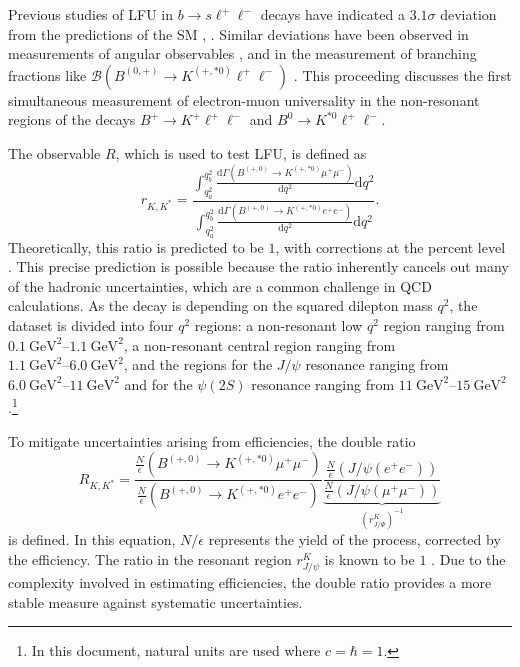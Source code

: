 Previous studies of LFU in $b\to s\ell^+\ell^-$ decays have indicated a $\num{3.1}\sigma$ 
deviation from the predictions of the SM \cite{previous_RK}, \cite{previous_RK*}. 
Similar deviations have been observed in measurements of angular observables \cite{angular_1}, 
\cite{angular_2} and in the measurement of branching fractions like 
$\mathcal{B}(B^{(0,+)}\to K^{(+,*0)}\ell^+\ell^-)$ \cite{Branchingfraction}. 
This proceeding discusses the first simultaneous measurement of electron-muon 
universality in the non-resonant regions of the decays $B^+\to K^+\ell^+\ell^-$ and $B^0\to K^{*0}\ell^+\ell^-$.

The observable $R$, which is used to test LFU, is defined as
\begin{equation}
    r_{K,K^*}= 
    \frac{\int_{q_a^2}^{q_b^2}\frac{\mathrm{d}\Gamma(B^{(+,0)}\to K^{(+,*0)}\mu^+\mu^-)}{\mathrm{d}q^2}\mathrm{d}q^2}
    {\int_{q_a^2}^{q_b^2}\frac{\mathrm{d}\Gamma(B^{(+,0)}\to K^{(+,*0)}e^+e^-)}{\mathrm{d}q^2}\mathrm{d}q^2} .
    \label{eqn:single_ratio}
\end{equation}
Theoretically, this ratio is predicted to be $\num{1}$, with corrections at 
the percent level \cite{LU_theo}. This precise prediction is possible because the ratio inherently 
cancels out many of the hadronic uncertainties, which are a common challenge in QCD calculations.
As the decay is depending on the squared dilepton mass $q^2$, the dataset is divided into four $q^2$ regions:
a non-resonant low $q^2$ region ranging from
$\SIrange{0.1}{1.1}{\giga\electronvolt\squared}$,
a non-resonant central region ranging from
$\SIrange{1.1}{6.0}{\giga\electronvolt\squared}$,
and the regions for the $J\!/\!\psi$ resonance ranging from 
$\SIrange{6.0}{11}{\giga\electronvolt\squared}$
and for the $\psi(2S)$ resonance ranging from
$\SIrange{11}{15}{\giga\electronvolt\squared}$.\footnote{In this document, natural units are used where $c=\hbar=1$.}

To mitigate uncertainties arising from efficiencies, the double ratio 
\begin{equation}
    R_{K,K^*}= 
    \frac{\frac{N}{\epsilon}(B^{(+,0)}\to K^{(+,*0)}\mu^+\mu^-)}
    {\frac{N}{\epsilon}(B^{(+,0)}\to K^{(+,*0)}e^+e^-)}
    \underbrace{\frac{\frac{N}{\epsilon}(J\!/\!\psi(e^+e^-))}{\frac{N}{\epsilon}(J\!/\!\psi(\mu^+\mu^-))}}_{(r^K_{J\!/\!\Psi})^{-1}}
    \label{eqn:double_ratio}
\end{equation}
is defined.
In this equation, $N/\epsilon$ represents the yield of the process, corrected by 
the efficiency. The ratio in the resonant region $r^K_{J\!/\!\psi}$ is known to be 
$\num{1}$ \cite{AULCHENKO2014227}. Due to the complexity involved in estimating 
efficiencies, the double ratio provides a more stable measure against systematic 
uncertainties.

